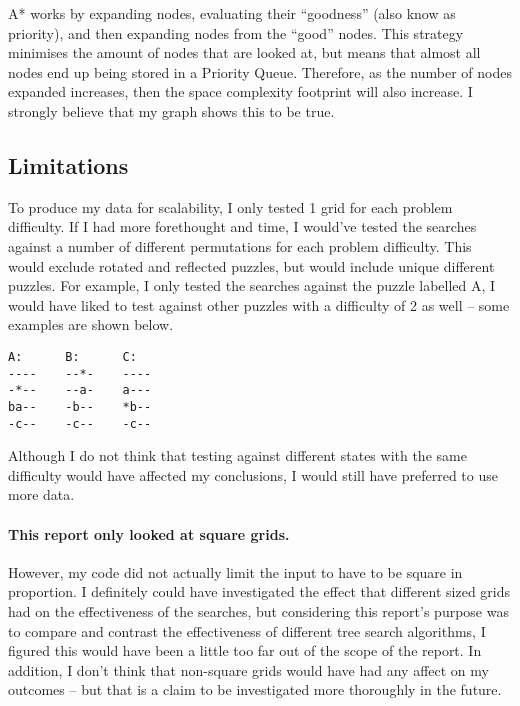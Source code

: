 \documentclass[a4paper]{article}
\begin{document}
A* works by expanding nodes, evaluating their ``goodness'' (also know as priority), and then expanding nodes from the ``good'' nodes.
This strategy minimises the amount of nodes that are looked at, but means that almost all nodes end up being stored in a Priority Queue.
Therefore, as the number of nodes expanded increases, then the space complexity footprint will also increase.
I strongly believe that my graph shows this to be true.

\subsection{Limitations}
To produce my data for scalability, I only tested 1 grid for each problem difficulty.
If I had more forethought and time, I would've tested the searches against a number of different permutations for each problem difficulty.
This would exclude rotated and reflected puzzles, but would include unique different puzzles.
For example, I only tested the searches against the puzzle labelled A, I would have liked to test against other puzzles with a difficulty of 2 as well -- some examples are shown below.
\begin{verbatim}
A:      B:      C:
----    --*-    ----
-*--    --a-    a---
ba--    -b--    *b--
-c--    -c--    -c--
\end{verbatim}

Although I do not think that testing against different states with the same difficulty would have affected my conclusions, I would still have preferred to use more data.

\paragraph{This report only looked at square grids.}
However, my code did not actually limit the input to have to be square in proportion.
I definitely could have investigated the effect that different sized grids had on the effectiveness of the searches,
  but considering this report's purpose was to compare and contrast the effectiveness of different tree search algorithms, I figured this would have been a little too far out of the scope of the report.
In addition, I don't think that non-square grids would have had any affect on my outcomes -- but that is a claim to be investigated more thoroughly in the future.



\end{document}
